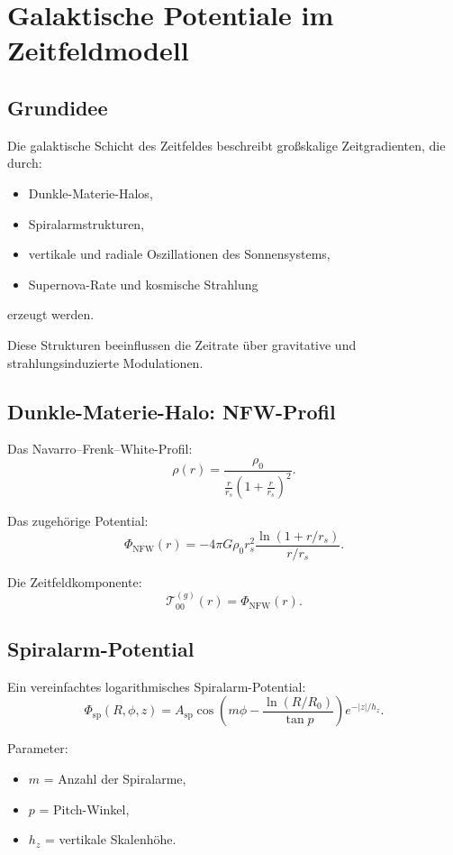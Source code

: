 
\section{Galaktische Potentiale im Zeitfeldmodell}

\subsection{Grundidee}

Die galaktische Schicht des Zeitfeldes beschreibt großskalige
Zeitgradienten, die durch:

\begin{itemize}
\item Dunkle-Materie-Halos,
\item Spiralarmstrukturen,
\item vertikale und radiale Oszillationen des Sonnensystems,
\item Supernova-Rate und kosmische Strahlung
\end{itemize}

erzeugt werden.

Diese Strukturen beeinflussen die Zeitrate über gravitative und
strahlungsinduzierte Modulationen.

\subsection{Dunkle-Materie-Halo: NFW-Profil}

Das Navarro–Frenk–White-Profil:
\[
\rho(r) = \frac{\rho_0}{\frac{r}{r_s}\left(1 + \frac{r}{r_s}\right)^2}.
\]

Das zugehörige Potential:
\[
\Phi_{\text{NFW}}(r) = -4\pi G \rho_0 r_s^2 \frac{\ln(1 + r/r_s)}{r/r_s}.
\]

Die Zeitfeldkomponente:
\[
\mathcal{T}^{(g)}_{00}(r) = \Phi_{\text{NFW}}(r).
\]

\subsection{Spiralarm-Potential}

Ein vereinfachtes logarithmisches Spiralarm-Potential:
\[
\Phi_{\text{sp}}(R,\phi,z) =
A_{\text{sp}} \cos\left(m\phi - \frac{\ln(R/R_0)}{\tan p}\right)
e^{-|z|/h_z}.
\]

Parameter:
\begin{itemize}
\item $m$ = Anzahl der Spiralarme,
\item $p$ = Pitch-Winkel,
\item $h_z$ = vertikale Skalenhöhe.
\end{itemize}

